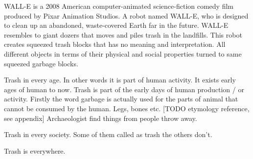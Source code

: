 WALL-E is a 2008 American computer-animated science-fiction comedy film produced by Pixar Animation Studios. A robot named WALL-E, who is designed to clean up an abandoned, waste-covered Earth far in the future. WALL-E resembles to giant dozers that moves and piles trash in the landfills. This robot creates squeezed trash blocks that has no meaning and interpretation. All different objects in terms of their physical and social properties turned to same squeezed garbage blocks.


Trash in every age. In other words it is part of human activity. It exists early ages of human to now. Trash is part of the early days of human production / or activity. Firstly the word garbage is actually used for the parts of animal that cannot be consumed by the human. Legs, bones etc. [TODO etymology reference, see appendix] Archaeologist find things from people throw away.

Trash in every society. Some of them called as trash the others don't.  

Trash is everywhere.





